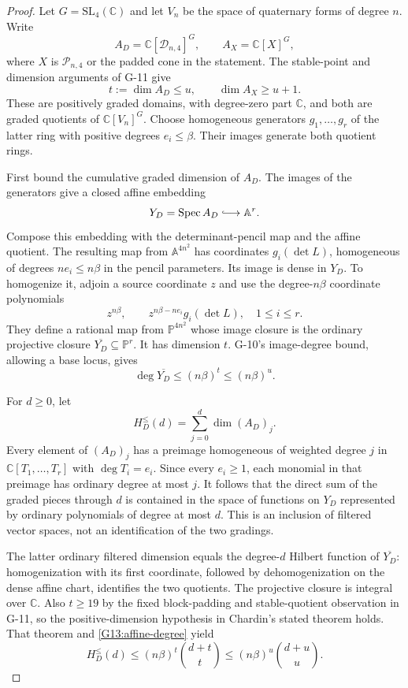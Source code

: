 \documentclass[11pt,a4paper]{article}
\theoremstyle{definition}\newtheorem{definition}{Definition}
\begin{document}
\begin{proof}
Let $G=\mathrm{SL}_4(\mathbb C)$ and let $V_n$ be the space
of quaternary forms of degree $n$. Write
\[
 A_D=\mathbb C[\mathcal D_{n,4}]^G,
 \qquad A_X=\mathbb C[X]^G,
\]
where $X$ is $\mathcal P_{n,4}$ or the padded cone in the
statement. The stable-point and dimension arguments of G-11
give
\begin{equation}\label{G13:dims}
 t:=\dim A_D\leq u,\qquad \dim A_X\geq u+1.
\end{equation}
These are positively graded domains, with degree-zero part
$\mathbb C$, and both are graded quotients of
$\mathbb C[V_n]^G$. Choose homogeneous generators
$g_1,\ldots,g_r$ of the latter ring with positive degrees
$e_i\leq\beta$. Their images generate both quotient rings.

First bound the cumulative graded dimension of $A_D$. The
images of the generators give a closed affine embedding
\[
 Y_D=\operatorname{Spec} A_D\lhook\joinrel\longrightarrow
 \mathbb A^r.
\]
Compose this embedding with the determinant-pencil map and
the affine quotient. The resulting map from
$\mathbb A^{4n^2}$ has coordinates
$g_i(\det L)$, homogeneous of degrees $ne_i\leq n\beta$
in the pencil parameters. Its image is dense in $Y_D$.
To homogenize it, adjoin a source coordinate $z$ and use
the degree-$n\beta$ coordinate polynomials
\[
 z^{n\beta},\qquad
 z^{n\beta-ne_i}g_i(\det L),\quad 1\leq i\leq r.
\]
They define a rational map from $\mathbb P^{4n^2}$ whose
image closure is the ordinary projective closure
$\overline{Y_D}\subseteq\mathbb P^r$. It has dimension
$t$. G-10's image-degree bound, allowing a base locus, gives
\begin{equation}\label{G13:affine-degree}
 \deg\overline{Y_D}\leq(n\beta)^t\leq(n\beta)^u.
\end{equation}

For $d\geq0$, let
\[
 H_D^{\leq}(d)=\sum_{j=0}^d\dim(A_D)_j.
\]
Every element of $(A_D)_j$ has a preimage homogeneous of
weighted degree $j$ in $\mathbb C[T_1,\ldots,T_r]$ with
$\deg T_i=e_i$. Since every $e_i\geq1$, each monomial in
that preimage has ordinary degree at most $j$. It follows
that the direct sum of the graded pieces through $d$ is
contained in the space of functions on $Y_D$ represented
by ordinary polynomials of degree at most $d$.
This is an inclusion of filtered vector spaces, not an
identification of the two gradings.

The latter ordinary filtered dimension equals the
degree-$d$ Hilbert function of $\overline{Y_D}$:
homogenization with its first coordinate, followed by
dehomogenization on the dense affine chart, identifies the
two quotients. The projective closure is integral over
$\mathbb C$. Also $t\geq19$ by the fixed block-padding and
stable-quotient observation in G-11, so the positive-dimension
hypothesis in Chardin's stated theorem holds. That theorem
and \eqref{G13:affine-degree} yield
\begin{equation}\label{G13:upper}
 H_D^{\leq}(d)
 \leq(n\beta)^t\binom{d+t}{t}
 \leq(n\beta)^u\binom{d+u}{u}.
\end{equation}


\end{proof}
\end{document}

